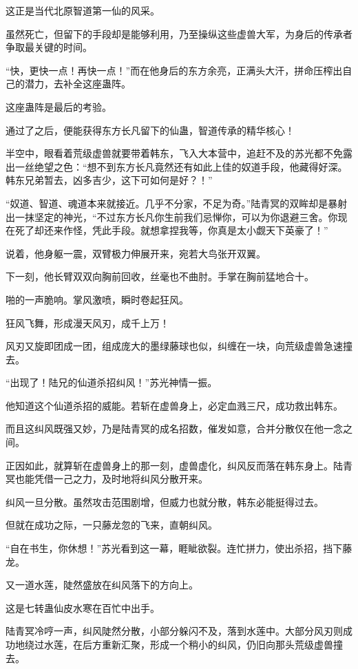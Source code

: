 \begin{this_body}
这正是当代北原智道第一仙的风采。

虽然死亡，但留下的手段却是能够利用，乃至操纵这些虚兽大军，为身后的传承者争取最关键的时间。

“快，更快一点！再快一点！”而在他身后的东方余亮，正满头大汗，拼命压榨出自己的潜力，去补全这座蛊阵。

这座蛊阵是最后的考验。

通过了之后，便能获得东方长凡留下的仙蛊，智道传承的精华核心！

半空中，眼看着荒级虚兽就要带着韩东，飞入大本营中，追赶不及的苏光都不免露出一丝绝望之色：“想不到东方长凡竟然还有如此上佳的奴道手段，他藏得好深。韩东兄弟暂去，凶多吉少，这下可如何是好？！”

“奴道、智道、魂道本来就接近。几乎不分家，不足为奇。”陆青冥的双眸却是暴射出一抹坚定的神光，“不过东方长凡你生前我们忌惮你，可以为你退避三舍。你现在死了却还来作怪，凭此手段。就想拿捏我等，你真是太小觑天下英豪了！”

说着，他身躯一震，双臂极力伸展开来，宛若大鸟张开双翼。

下一刻，他长臂双双向胸前回收，丝毫也不曲肘。手掌在胸前猛地合十。

啪的一声脆响。掌风激喷，瞬时卷起狂风。

狂风飞舞，形成漫天风刃，成千上万！

风刃又旋即团成一团，组成庞大的墨绿藤球也似，纠缠在一块，向荒级虚兽急速撞去。

“出现了！陆兄的仙道杀招纠风！”苏光神情一振。

他知道这个仙道杀招的威能。若斩在虚兽身上，必定血溅三尺，成功救出韩东。

而且这纠风既强又妙，乃是陆青冥的成名招数，催发如意，合并分散仅在他一念之间。

正因如此，就算斩在虚兽身上的那一刻，虚兽虚化，纠风反而落在韩东身上。陆青冥也能凭借一己之力，及时地将纠风分散开来。

纠风一旦分散。虽然攻击范围剧增，但威力也就分散，韩东必能挺得过去。

但就在成功之际，一只藤龙忽的飞来，直朝纠风。

“自在书生，你休想！”苏光看到这一幕，睚眦欲裂。连忙拼力，使出杀招，挡下藤龙。

又一道水莲，陡然盛放在纠风落下的方向上。

这是七转蛊仙皮水寒在百忙中出手。

陆青冥冷哼一声，纠风陡然分散，小部分躲闪不及，落到水莲中。大部分风刃则成功地绕过水莲，在后方重新汇聚，形成一个稍小的纠风，仍旧向那头荒级虚兽撞去。


\end{this_body}
